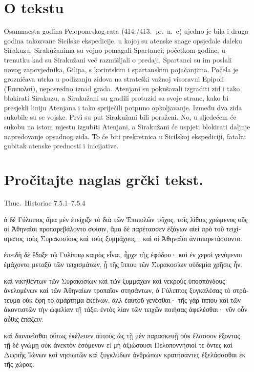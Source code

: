 


\section*{O tekstu}

Osamnaesta godina Peloponeskog rata (414./413.\ pr.~n.~e) ujedno je bila i druga godina takozvane Sicilske ekspedicije, u kojoj su atenske snage opsjedale daleku Sirakuzu. Sirakužanima su vojno pomagali Spartanci; početkom godine, u trenutku kad su Sirakužani već razmišljali o predaji, Spartanci su im poslali novog zapovjednika, Gilipa, s korintskim i spartanskim pojačanjima. Počela je grozničava utrka u podizanju zidova na strateški važnoj visoravni Epipoli \textgreek[variant=ancient]{(Ἐπιπολαί),} neposredno iznad grada. Atenjani su pokušavali izgraditi zid i tako blokirati Sirakuzu, a Sirakužani su gradili protuzid sa svoje strane, kako bi presjekli liniju Atenjana i tako spriječili potpuno opkoljavanje. Između dva zida sukobile su se vojske. Prvi su put Sirakužani bili poraženi. No, u sljedećem će sukobu na istom mjestu izgubiti Atenjani, a Sirakužani će uspjeti blokirati daljnje napredovanje opsadnog zida. To će biti prekretnica u Sicilskoj ekspediciji, fatalni gubitak atenske prednosti i inicijative.

\newpage

\section*{Pročitajte naglas grčki tekst.}

Thuc.\ Historiae 7.5.1–7.5.4


\medskip


{\large

\begin{greek}

\noindent ὁ δὲ Γύλιππος ἅμα μὲν ἐτείχιζε τὸ διὰ τῶν Ἐπιπολῶν τεῖχος, τοῖς λίθοις χρώμενος οὓς οἱ Ἀθηναῖοι προπαρεβάλοντο σφίσιν, ἅμα δὲ παρέτασσεν ἐξάγων αἰεὶ πρὸ τοῦ τειχίσματος τοὺς Συρακοσίους καὶ τοὺς ξυμμάχους· καὶ οἱ Ἀθηναῖοι ἀντιπαρετάσσοντο.

ἐπειδὴ δὲ ἔδοξε τῷ Γυλίππῳ καιρὸς εἶναι, ἦρχε τῆς ἐφόδου· καὶ ἐν χερσὶ γενόμενοι ἐμάχοντο μεταξὺ τῶν τειχισμάτων, ᾗ τῆς ἵππου τῶν Συρακοσίων οὐδεμία χρῆσις ἦν.

καὶ νικηθέντων τῶν Συρακοσίων καὶ τῶν ξυμμάχων καὶ νεκροὺς ὑποσπόνδους ἀνελομένων καὶ τῶν Ἀθηναίων τροπαῖον στησάντων, ὁ Γύλιππος ξυγκαλέσας τὸ στράτευμα οὐκ ἔφη τὸ ἁμάρτημα ἐκείνων, ἀλλ ἑαυτοῦ γενέσθαι· τῆς γὰρ ἵππου καὶ τῶν ἀκοντιστῶν τὴν ὠφελίαν τῇ τάξει ἐντὸς λίαν τῶν τειχῶν ποιήσας ἀφελέσθαι· νῦν οὖν αὖθις ἐπάξειν.

καὶ διανοεῖσθαι οὕτως ἐκέλευεν αὐτοὺς ὡς τῇ μὲν παρασκευῇ οὐκ ἔλασσον ἕξοντας, τῇ δὲ γνώμῃ οὐκ ἀνεκτὸν ἐσόμενον εἰ μὴ ἀξιώσουσι Πελοποννήσιοί τε ὄντες καὶ Δωριῆς Ἰώνων καὶ νησιωτῶν καὶ ξυγκλύδων ἀνθρώπων κρατήσαντες ἐξελάσασθαι ἐκ τῆς χώρας.

\end{greek}

}



